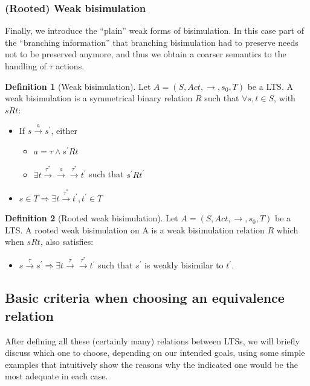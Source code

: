 \documentclass[11pt]{article}
\theoremstyle{definition}
\newtheorem{definition}{Definition}
\theoremstyle{plain}
\begin{document}
\subsubsection{(Rooted) Weak bisimulation}
Finally, we introduce the ``plain'' weak forms of bisimulation. In this case part of the ``branching information'' that branching bisimulation had to preserve needs not to be preserved anymore, and thus we obtain a coarser semantics to the handling of $ \tau $ actions.
\begin{definition} [Weak bisimulation]
	Let $ A = (S, Act, \rightarrow, s_0, T) $ be a LTS. A weak bisimulation is a symmetrical binary relation $ R $ such that $\forall s, t \in S$, with $ s R t $:
	\begin{itemize}
		\item If $ s\xrightarrow{a}s^\prime  $, either
		\begin{itemize}
			\item $ a = \tau  \wedge s^\prime  R t $
			\item $ \exists t\xrightarrow{\tau^*}\xrightarrow{a}\xrightarrow{\tau^*}t^\prime  $ such that $ s^\prime  R t^\prime  $
		\end{itemize}
		\item $ s \in T \Rightarrow \exists t\xrightarrow{\tau^*}t^\prime , t^\prime  \in T $
	\end{itemize}
\end{definition}

\begin{definition} [Rooted weak bisimulation]
	Let $ A = (S, Act, \rightarrow, s_0, T) $ be a LTS. A rooted weak bisimulation on A is a weak bisimulation relation $ R $ which when $s R t$, also satisfies:
	\begin{itemize}
		\item $ s\xrightarrow{\tau}s^\prime   \Rightarrow \exists  t\xrightarrow{\tau}\xrightarrow{\tau^*}t^\prime  $ such that $ s^\prime $ is weakly bisimilar to $ t^\prime $.
	\end{itemize}
\end{definition}


\subsection{Basic criteria when choosing an equivalence relation}
After defining all these (certainly many) relations between LTSs, we will briefly discuss which one to choose, depending on our intended goals, using some simple examples that intuitively show the reasons why the indicated one would be the most adequate in each case.
\end{document}
